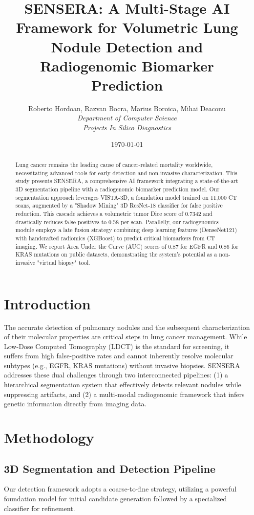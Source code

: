 \documentclass[10pt, twocolumn, letterpaper]{article}
\title{\textbf{SENSERA: A Multi-Stage AI Framework for Volumetric Lung Nodule Detection and Radiogenomic Biomarker Prediction}}
\author{
    Roberto Hordoan, Razvan Bocra, Marius Boroica, Mihai Deaconu \\
    \textit{Department of Computer Science} \\
    \textit{Projects In Silico Diagnostics}
}
\date{\today}
\begin{document}
\maketitle

\begin{abstract}
Lung cancer remains the leading cause of cancer-related mortality worldwide, necessitating advanced tools for early detection and non-invasive characterization. This study presents SENSERA, a comprehensive AI framework integrating a state-of-the-art 3D segmentation pipeline with a radiogenomic biomarker prediction model. Our segmentation approach leverages VISTA-3D, a foundation model trained on 11,000 CT scans, augmented by a "Shadow Mining" 3D ResNet-18 classifier for false positive reduction. This cascade achieves a volumetric tumor Dice score of 0.7342 and drastically reduces false positives to 0.58 per scan. Parallelly, our radiogenomics module employs a late fusion strategy combining deep learning features (DenseNet121) with handcrafted radiomics (XGBoost) to predict critical biomarkers from CT imaging. We report Area Under the Curve (AUC) scores of 0.87 for EGFR and 0.86 for KRAS mutations on public datasets, demonstrating the system's potential as a non-invasive "virtual biopsy" tool.
\end{abstract}

\section{Introduction}
The accurate detection of pulmonary nodules and the subsequent characterization of their molecular properties are critical steps in lung cancer management. While Low-Dose Computed Tomography (LDCT) is the standard for screening, it suffers from high false-positive rates and cannot inherently resolve molecular subtypes (e.g., EGFR, KRAS mutations) without invasive biopsies. SENSERA addresses these dual challenges through two interconnected pipelines: (1) a hierarchical segmentation system that effectively detects relevant nodules while suppressing artifacts, and (2) a multi-modal radiogenomic framework that infers genetic information directly from imaging data.

\section{Methodology}

\subsection{3D Segmentation and Detection Pipeline}
Our detection framework adopts a coarse-to-fine strategy, utilizing a powerful foundation model for initial candidate generation followed by a specialized classifier for refinement.
\end{document}
